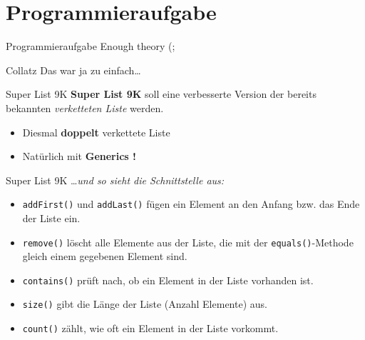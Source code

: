 \documentclass[18pt]{beamer}
\begin{document}
\section{Programmieraufgabe}

\begin{frame}{Programmieraufgabe}
    \Large{Enough theory (;}
\end{frame}

\begin{frame}{Collatz}
    Das war ja zu einfach\dots
\end{frame}

\begin{frame}{Super List 9K}
    \textbf{Super List 9K} soll eine verbesserte Version der bereits bekannten \textit{verketteten Liste} werden.

    \begin{itemize}
        \item Diesmal \textbf{doppelt} verkettete Liste
        \item Natürlich mit \textbf{Generics !}
    \end{itemize}

\end{frame}

\begin{frame}{Super List 9K}
    \dots \textit{und so sieht die Schnittstelle aus:}
    \vspace{.2in}
    \begin{itemize}
        \item \texttt{addFirst()} und \texttt{addLast()} fügen ein Element an den Anfang bzw. das Ende der Liste ein.
        \item \texttt{remove()} löscht alle Elemente aus der Liste, die mit der \texttt{equals()}-Methode gleich einem gegebenen Element sind.
        \item \texttt{contains()} prüft nach, ob ein Element in der Liste vorhanden ist.
        \item \texttt{size()} gibt die Länge der Liste (Anzahl Elemente) aus.
        \item \texttt{count()} zählt, wie oft ein Element in der Liste vorkommt.
    \end{itemize}
\end{frame}
\end{document}

